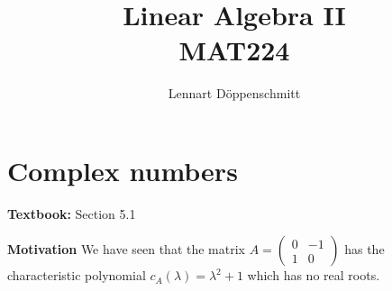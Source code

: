 \documentclass[letterpaper, 10pt]{article}
\begin{document}

\title{Linear Algebra II \\ \Large{MAT224}}
\author{Lennart Döppenschmitt}

\section*{Complex numbers}%
\textbf{Textbook:} Section 5.1



\lb
\textbf{Motivation}
\lb
We have seen that the matrix $ A = \begin{pmatrix} 0 & -1 \\ 1 & 0\end{pmatrix}$ has the
characteristic polynomial $c_A(λ) = λ^2 + 1$ which has no real roots.
\end{document}
